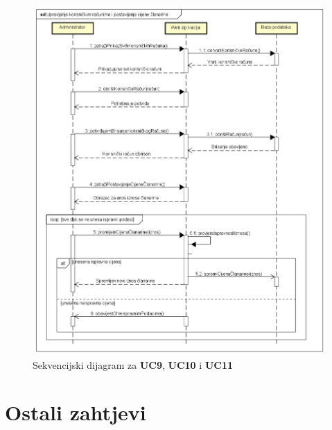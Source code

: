 				\begin{figure}[H]
					\includegraphics[width=\textwidth]{dijagrami/sd4.PNG}
					\centering
					\vspace{-0.7cm}
					\caption{Sekvencijski dijagram za \textbf{UC9}, \textbf{UC10} i \textbf{UC11}}
					\label{fig:promjene}
				\end{figure}
				
				\vspace{-0.5cm}
				
				\newpage
	
		\section{Ostali zahtjevi}
		
